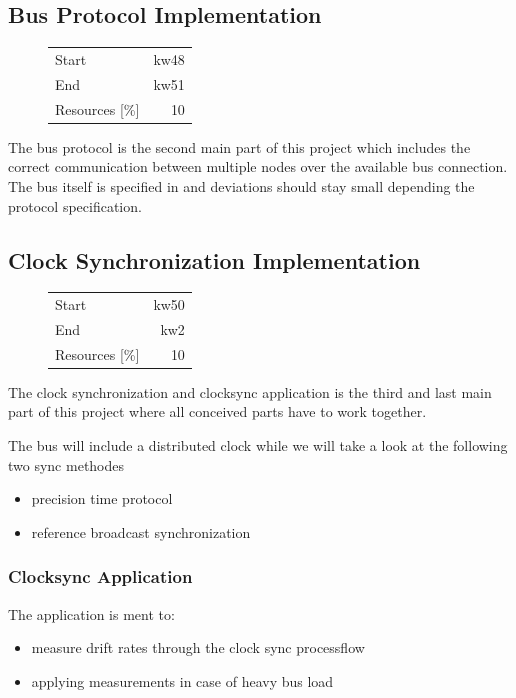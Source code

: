 \subsection{Bus Protocol Implementation}
\begin{figure}
\begin{tabular}[t]{|lr|}
\hline
Start & kw48\\
End & kw51\\
Resources [\%] & 10\\
\hline
\end{tabular}
\end{figure}
The bus protocol is the second main part of this project which includes the correct communication
between multiple nodes over the available bus connection. 
The bus itself is specified in \cite [NESD2]{NESD2} and deviations should stay small depending 
the protocol specification.
\subsection{Clock Synchronization Implementation}
\begin{figure}
\begin{tabular}[t]{|lr|}
\hline
Start & kw50\\
End & kw2\\
Resources [\%] & 10\\
\hline
\end{tabular}
\end{figure}
The clock synchronization and clocksync application is the third and last main part of 
this project where all conceived parts have to work together.

The bus will include a distributed clock while we will 
take a look at the following two sync methodes
\begin{itemize}
 \item precision time protocol
 \item reference broadcast synchronization
\end{itemize}

\subsubsection{Clocksync Application}
The application is ment to:
\begin{itemize}
 \item measure drift rates through the clock sync processflow
 \item applying measurements in case of heavy bus load
\end{itemize}

